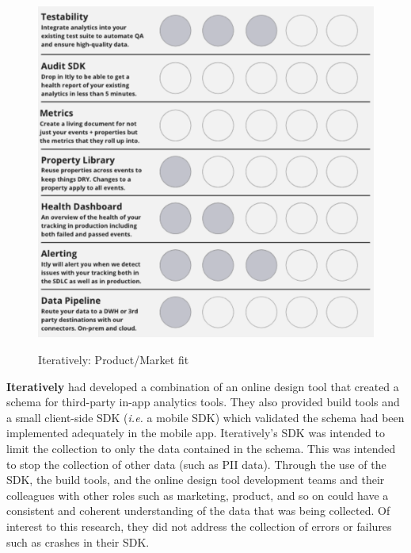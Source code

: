 \begin{figure}[htbp!]
\begin{minipage}{.45\textwidth}
  \label{fig:iteratively-spend-ten-dots}
\end{minipage}\hfill%
\begin{minipage}{.45\textwidth}
  \centering
  \includegraphics[width=\textwidth]{images/iteratively/dot-voting-example.png}
  \label{fig:iteratively-dot-voting-example}
\end{minipage}
    \caption{Iteratively: Product/Market fit}
    \label{fig:iteratively-product-market-fit}
\end{figure}

\textbf{Iteratively} had developed a combination of an online design tool that created a schema for third-party in-app analytics tools. They also provided build tools and a small client-side SDK (\textit{i.e.} a mobile SDK) which validated the schema had been implemented adequately in the mobile app. %
Iteratively's SDK was intended to limit the collection to only the data contained in the schema. This was intended to stop the collection of other data (such as PII data). Through the use of the SDK, the build tools, and the online design tool development teams and their colleagues with other roles such as marketing, product, and so on could have a consistent and coherent understanding of the data that was being collected. Of interest to this research, they did not address the collection of errors or failures such as crashes in their SDK.

